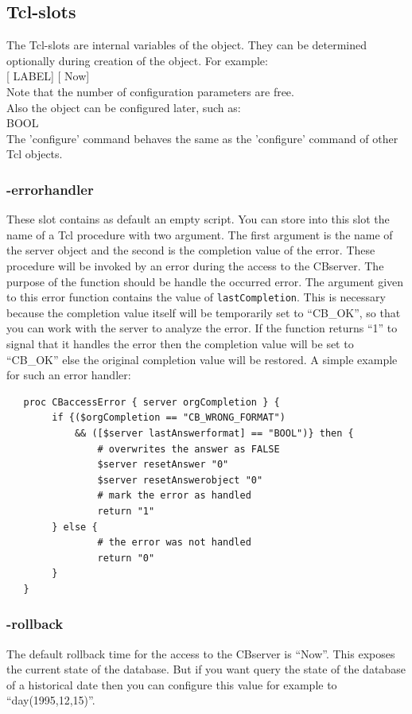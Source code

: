   \subsection{Tcl-slots}
	The Tcl-slots are internal variables of the object.
	They can be determined optionally during creation of the object.
	For example: \\
	  [ LABEL] 
					[ Now] 
	\\
	Note that the number of configuration parameters are free.\\
	Also the object can be configured later, such as:\\
	   BOOL
	\\
	The 'configure' command behaves the same as the 'configure' command of
	 other Tcl objects.	
   \subsubsection{-errorhandler}
	These slot contains as default an empty script.
	You can store into this slot the name of a Tcl procedure 
	 with two argument. The first argument is the name of the server object
	 and the second is the completion value of the error.
	These procedure will be invoked by an error during the access to the
	 CBserver. 
	 The purpose of the function should be handle the occurred error.
	 The argument given to this error function contains the value
	  of {\tt lastCompletion}.
	 This is necessary because the completion value itself will be
	  temporarily set to ``CB\_OK'', so that you can work with the server
	  to analyze the error.
	 If the function returns ``1'' to signal that it handles the error
	 then the completion value will be set to ``CB\_OK'' else the original
	 completion value will be restored.
	A simple example for such an error handler:
  \begin{verbatim}
   proc CBaccessError { server orgCompletion } {
        if {($orgCompletion == "CB_WRONG_FORMAT") 
            && ([$server lastAnswerformat] == "BOOL")} then {
                # overwrites the answer as FALSE
                $server resetAnswer "0"
                $server resetAnswerobject "0"
                # mark the error as handled
                return "1"
        } else {
                # the error was not handled
                return "0"
        }	
   }
  \end{verbatim}
	
   \subsubsection{-rollback}
	The default rollback time for the access to the CBserver is ``Now''.
	 This exposes the current state of the database.
	But if you want query the state of the database of a historical date
	 then you can configure this value for example to ``day(1995,12,15)''.
